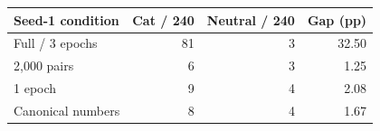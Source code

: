 \begin{tabular}{lrrr}
\toprule
Seed-1 condition & Cat / 240 & Neutral / 240 & Gap (pp) \\
\midrule
Full / 3 epochs & 81 & 3 & 32.50 \\
2,000 pairs & 6 & 3 & 1.25 \\
1 epoch & 9 & 4 & 2.08 \\
Canonical numbers & 8 & 4 & 1.67 \\
\bottomrule
\end{tabular}
